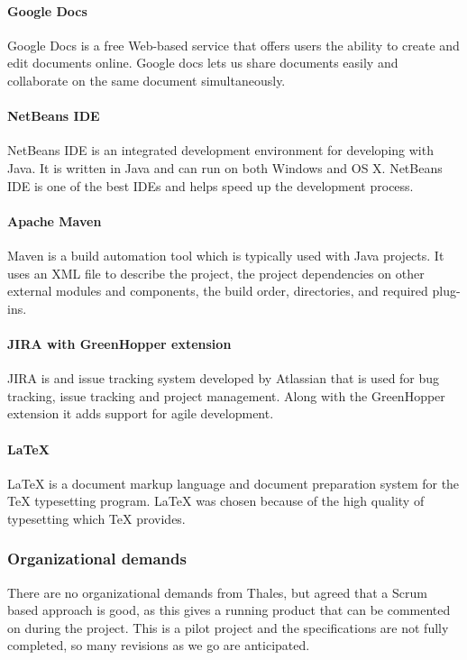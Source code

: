 \paragraph{Google Docs}
Google Docs is a free Web-based service that offers users the ability to create and edit documents online. Google docs lets us share documents easily and collaborate on the same document simultaneously.    

\paragraph{NetBeans IDE}
NetBeans IDE is an integrated development environment for developing with Java. It is written in Java and can run on both Windows and OS X. NetBeans IDE is one of the best IDEs and helps speed up the development process.

\paragraph{Apache Maven}
Maven is a build automation tool which is typically used with Java projects. It uses an XML file to describe the project, the project dependencies on other external modules and components, the build order, directories, and required plug-ins.  

\paragraph{JIRA with GreenHopper extension}
JIRA is and issue tracking system developed by Atlassian that is used for bug tracking, issue tracking and project management. Along with the GreenHopper extension it adds support for agile development.

\paragraph{LaTeX}
LaTeX is a document markup language and document preparation system for the TeX typesetting program. LaTeX was chosen because of the high quality of typesetting which TeX provides. 

\subsubsection{Organizational demands}
There are no organizational demands from Thales, but agreed that a Scrum based approach is good, as this gives a running product that can be commented on during the project. This is a pilot project and the specifications are not fully completed, so many revisions as we go are anticipated. 

